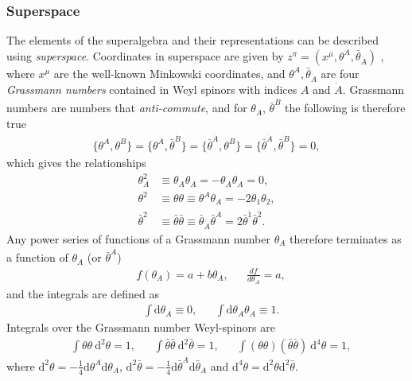 \documentclass[twoside,english]{uiofysmaster}
\begin{document}
\subsubsection{Superspace}

The elements of the superalgebra and their representations can be described using \textit{superspace}. Coordinates in superspace are given by $z^{\pi} = (x^{\mu}, \theta^A, \bar{\theta}_{\dot{A}})$ , where $x^{\mu}$ are the well-known Minkowski coordinates, and $\theta^A, \bar{\theta}_{\dot{A}}$  are four \textit{Grassmann numbers} contained in Weyl spinors with indices $A$ and $\dot{A}$. Grassmann numbers are numbers that \textit{anti-commute}, and for $\theta_A$, $\bar{\theta}^{\dot{B}}$ the following is therefore true
\begin{align}
\{ \theta^A, \theta^B\} = \{ \theta^A, \bar{\theta}^{\dot{B}}\} = \{ \bar{\theta}^{\dot{A}}, \theta^B\} = \{ \bar{\theta}^{\dot{A}}, \bar{\theta}^{\dot{B}} \} =0,
\end{align}
which gives the relationships
\begin{align}
\theta_A^2 &\equiv \theta_A \theta_A = - \theta_A \theta_A =  0,\\
\theta^2 &\equiv \theta \theta \equiv \theta^A \theta_A = -2 \theta_1 \theta_2,\\
\bar{\theta}^2 &\equiv \bar{\theta} \bar{\theta} \equiv \bar{\theta}_{\dot{A}} \bar{\theta}^{\dot{A}} = 2 \bar{\theta}^{\dot{1}} \bar{\theta}^{\dot{2}}. 
\end{align}
Any power series of functions of a Grassmann number $\theta_A$ therefore terminates as a function of $\theta_A$ (or $\bar{\theta}^{\dot{A}}$)
\begin{align}
&f(\theta_A) = a + b \theta_A, && \frac{d f}{d \theta_A} = a,
\end{align}
and the integrals are defined as 
\begin{align}
&\int \mathrm{d} \theta_A \equiv 0, && \int \mathrm{d} \theta_A \theta_A \equiv 1.
\end{align}
Integrals over the Grassmann number Weyl-spinors are 
\begin{align}
& \int \theta \theta~\mathrm{d}^2\theta=1, && \int \bar{\theta} \bar{\theta} ~ \mathrm{d}^2 \bar{\theta}=1, && \int (\theta \theta) (\bar{\theta} \bar{\theta})~\mathrm{d}^4 \theta=1,
\end{align}
where $\mathrm{d}^2\theta = - \frac{1}{4} \mathrm{d} \theta^A \mathrm{d}\theta_A$, $\mathrm{d}^2\bar{\theta} = - \frac{1}{4} \mathrm{d} \bar{\theta}^A \mathrm{d}\bar{\theta}_A$ and $\mathrm{d}^4 \theta = \mathrm{d}^2 \theta \mathrm{d}^2 \bar{\theta}$.
\end{document}
